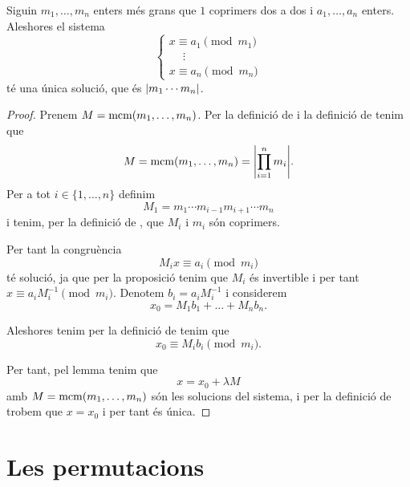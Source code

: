 \documentclass[../Apunts.tex]{subfiles}
\begin{document}
	\begin{theorem}
		\label{thm:TXR}\label{thm:Teorema xinès de les restes}
		Siguin \(m_{1},\dots,m_{n}\) enters més grans que \(1\) coprimers dos a dos i \(a_{1},\dots,a_{n}\) enters. Aleshores el sistema
		\[\begin{cases}
		x\equiv a_{1}\pmod{m_{1}}\\
		\quad\ \vdots\\
		x\equiv a_{n}\pmod{m_{n}}
		\end{cases}\]
		té una única solució, que és \(\abs{m_{1}\cdots m_{n}}\).
		\begin{proof}
			Prenem \(M=\operatorname{mcm}(m_{1},\dots,m_{n})\). Per la definició de  i la definició de  tenim que \[M=\mcm(m_{1},\dots,m_{n})=\abs{\prod_{i=1}^{n}m_{i}}.\]
			Per a tot \(i\in\{1,\dots,n\}\) definim
			\[M_{1}=m_{1}\cdots m_{i-1}m_{i+1}\cdots m_{n}\]
			i tenim, per la definició de , que \(M_{i}\) i \(m_{i}\) són coprimers.
			
			Per tant la congruència
			\[M_{i}x\equiv a_{i}\pmod{m_{i}}\]
			té solució, ja que per la proposició  tenim que \(M_{i}\) és invertible i per tant \(x\equiv a_{i}M_{i}^{-1}\pmod{m_{i}}\). Denotem \(b_{i}=a_{i}M_{i}^{-1}\) i considerem
			\[x_{0}=M_{1}b_{1}+\dots+M_{n}b_{n}.\]
			
			Aleshores tenim per la definició de  tenim que
			\[x_{0}\equiv M_{i}b_{i}\pmod{m_{i}}.\]
			
			Per tant, pel lemma  tenim que
			\[x=x_{0}+\lambda M\]
			amb \(M=\operatorname{mcm}(m_{1},\dots,m_{n})\) són les solucions del sistema, i per la definició de  trobem que \(x=x_{0}\) i per tant és única.
		\end{proof}
	\end{theorem}
	\section{Les permutacions}
\end{document}
